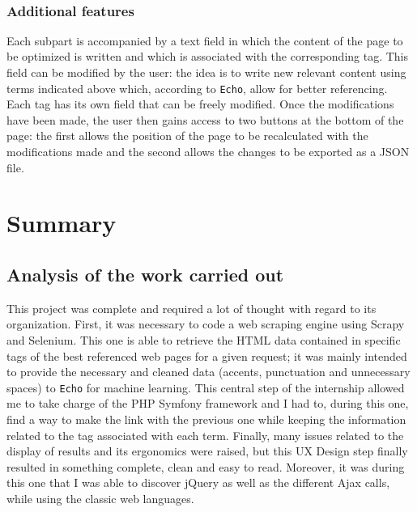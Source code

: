 \documentclass[12pt]{article}
\begin{document}
\

\subsubsection{Additional features}

Each subpart is accompanied by a text field in which the content of the page to be optimized is written and which is associated with the corresponding tag. This field can be modified by the user: the idea is to write new relevant content using terms indicated above which, according to \texttt{Echo}, allow for better referencing. Each tag has its own field that can be freely modified. Once the modifications have been made, the user then gains access to two buttons at the bottom of the page: the first allows the position of the page to be recalculated with the modifications made and the second allows the changes to be exported as a \textsf{JSON} file.


\newpage
\section{Summary}

\subsection{Analysis of the work carried out}

This project was complete and required a lot of thought with regard to its organization. First, it was necessary to code a web scraping engine using \textsf{Scrapy} and \textsf{Selenium}. This one is able to retrieve the HTML data contained in specific tags of the best referenced web pages for a given request; it was mainly intended to provide the necessary and cleaned data (accents, punctuation and unnecessary spaces) to \texttt{Echo} for machine learning. This central step of the internship allowed me to take charge of the \textsf{PHP Symfony} framework and I had to, during this one, find a way to make the link with the previous one while keeping the information related to the tag associated with each term. Finally, many issues related to the display of results and its ergonomics were raised, but this UX Design step finally resulted in something complete, clean and easy to read. Moreover, it was during this one that I was able to discover \textsf{jQuery} as well as the different \textsf{Ajax} calls, while using the classic web languages.
\end{document}
